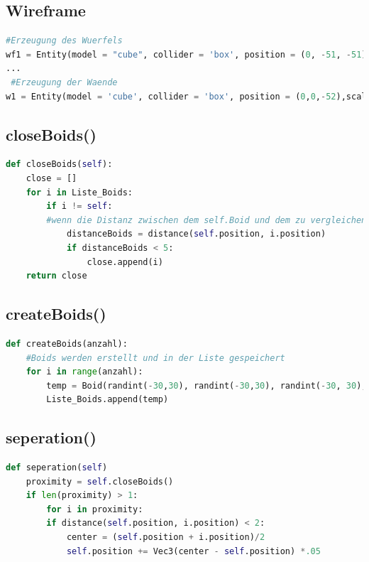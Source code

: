 \documentclass[a4paper, hidelinks, 12pt]{article}
\begin{document}
\subsection{Wireframe}\label{CodeRaum}
\begin{lstlisting}[style=mystyle, language=Python]
 #Erzeugung des Wuerfels
wf1 = Entity(model = "cube", collider = 'box', position = (0, -51, -51), scale_x = 102)
...
 #Erzeugung der Waende
w1 = Entity(model = 'cube', collider = 'box', position = (0,0,-52),scale=(110,110,0), color = color.red, alpha = 0)
\end{lstlisting}
\subsection{closeBoids()}\label{CodecloseBoids}
\begin{lstlisting}[style=mystyle, language=Python]
def closeBoids(self):
    close = []
    for i in Liste_Boids:
    	if i != self:
    	#wenn die Distanz zwischen dem self.Boid und dem zu vergleichenden Boid unter 5 liegt wird der vergleichende Boid in die Liste mit den Boids in der Naehe hinzugefuegt
		    distanceBoids = distance(self.position, i.position)
    		if distanceBoids < 5:
    			close.append(i)
    return close
\end{lstlisting}

\newpage
\subsection{createBoids()}\label{CodecreateBoids}
\begin{lstlisting}[style=mystyle, language=Python]
def createBoids(anzahl):
	#Boids werden erstellt und in der Liste gespeichert
	for i in range(anzahl):
		temp = Boid(randint(-30,30), randint(-30,30), randint(-30, 30), randint(0,360), randint(0,360), randint(0,360), uniform(0.0, 100.0), uniform(0.0, 10.0), 300.0, 1, groesse)
		Liste_Boids.append(temp)
\end{lstlisting}
\subsection{seperation()}\label{Codeseperation}
\begin{lstlisting}[style=mystyle, language=Python]
def seperation(self)
	proximity = self.closeBoids()
	if len(proximity) > 1:
		for i in proximity:
		if distance(self.position, i.position) < 2:
			center = (self.position + i.position)/2
			self.position += Vec3(center - self.position) *.05
\end{lstlisting}
\end{document}
